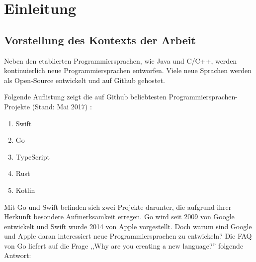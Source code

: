 \chapter{Einleitung}

\section{Vorstellung des Kontexts der Arbeit}
Neben den etablierten Programmiersprachen, wie Java und C/C++, werden kontinuierlich neue Programmiersprachen entworfen.
Viele neue Sprachen werden als Open-Source entwickelt und auf Github gehostet.

Folgende Auflistung zeigt die auf Github beliebtesten Programmiersprachen-Projekte (Stand: Mai 2017) \cite{Github}:


\begin{enumerate}
    \item Swift
    \item Go
    \item TypeScript
    \item Rust
    \item Kotlin
\end{enumerate}

Mit Go und Swift befinden sich zwei Projekte darunter, die aufgrund ihrer Herkunft besondere Aufmerksamkeit erregen.
Go wird seit 2009 von Google entwickelt und Swift wurde 2014 von Apple vorgestellt.
Doch warum sind Google und Apple daran interessiert neue Programmiersprachen zu entwickeln?
Die \gls{FAQ} von Go liefert auf die Frage ,,Why are you creating a new language?'' folgende Antwort: 

